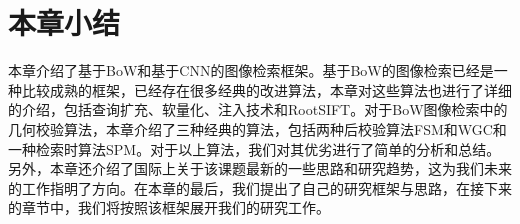 \section{本章小结}
本章介绍了基于BoW和基于CNN的图像检索框架。基于BoW的图像检索已经是一种比较成熟的框架，已经存在很多经典的改进算法，本章对这些算法也进行了详细的介绍，包括查询扩充、软量化、注入技术和RootSIFT。对于BoW图像检索中的几何校验算法，本章介绍了三种经典的算法，包括两种后校验算法FSM和WGC和一种检索时算法SPM。对于以上算法，我们对其优劣进行了简单的分析和总结。另外，本章还介绍了国际上关于该课题最新的一些思路和研究趋势，这为我们未来的工作指明了方向。在本章的最后，我们提出了自己的研究框架与思路，在接下来的章节中，我们将按照该框架展开我们的研究工作。

